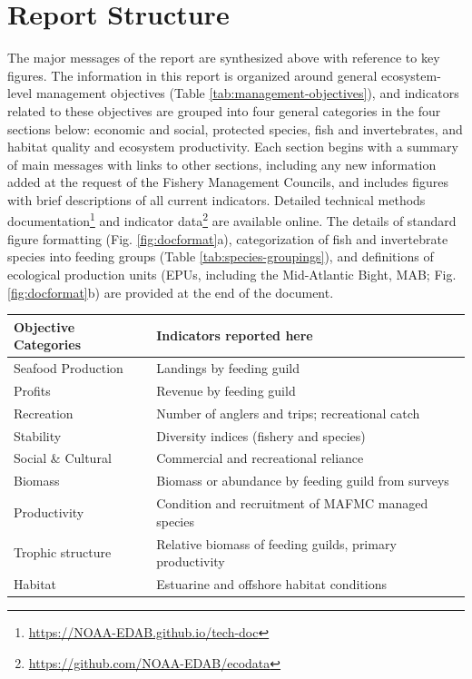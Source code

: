 \documentclass[10pt,]{article}
\let\rmarkdownfootnote\footnote%
\def\footnote{\protect\rmarkdownfootnote}
\let\origtable\table
\let\endorigtable\endtable
\renewenvironment{table}[1][2] {
    \expandafter\origtable\expandafter[H]
} {
    \endorigtable
}
\begin{document}
\section{Report Structure}\label{report-structure}

The major messages of the report are synthesized above with reference to
key figures. The information in this report is organized around general
ecosystem-level management objectives (Table
\ref{tab:management-objectives}), and indicators related to these
objectives are grouped into four general categories in the four sections
below: economic and social, protected species, fish and invertebrates,
and habitat quality and ecosystem productivity. Each section begins with
a summary of main messages with links to other sections, including any
new information added at the request of the Fishery Management Councils,
and includes figures with brief descriptions of all current indicators.
Detailed technical methods documentation\footnote{\url{https://NOAA-EDAB.github.io/tech-doc}}
and indicator data\footnote{\url{https://github.com/NOAA-EDAB/ecodata}}
are available online. The details of standard figure formatting (Fig.
\ref{fig:docformat}a), categorization of fish and invertebrate species
into feeding groups (Table \ref{tab:species-groupings}), and definitions
of ecological production units (EPUs, including the Mid-Atlantic Bight,
MAB; Fig. \ref{fig:docformat}b) are provided at the end of the document.

\begin{table}[!h]

\caption{\label{tab:management-objectives}Established ecosystem-scale objectives in the Mid-Atlantic Bight}
\centering
\begin{tabular}{ll}
\toprule
\textbf{Objective Categories} & \textbf{Indicators reported here}\\
\midrule
Seafood Production & Landings by feeding guild\\
Profits & Revenue by feeding guild\\
Recreation & Number of anglers and trips; recreational catch\\
Stability & Diversity indices (fishery and species)\\
Social \& Cultural & Commercial and recreational reliance\\
\addlinespace
Biomass & Biomass or abundance by feeding guild from surveys\\
Productivity & Condition and recruitment of MAFMC managed species\\
Trophic structure & Relative biomass of feeding guilds, primary productivity\\
Habitat & Estuarine and offshore habitat conditions\\
\bottomrule
\end{tabular}
\end{table}
\end{document}
